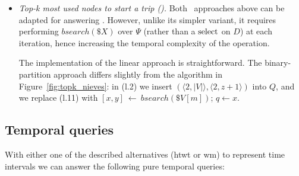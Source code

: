 \begin{itemize}[leftmargin=3mm]
	\item {\em Top-k most used nodes to start a trip (\Stks).}
	Both \Stk\ approaches above can be adapted for answering \Stks.
	However, unlike its simpler variant, it requires performing $bsearch(\$X)$ over $\Psi$ (rather than a $\operatorname{select}$ on $D$) at
	each iteration, hence increasing the temporal complexity of the operation.

	The implementation of the linear approach is straightforward. The binary-partition approach differs slightly 
	from the algorithm in Figure~\ref{fig:topk_nieves}: in (l.2) we insert $(\langle 2, |V| \rangle, \langle 2,z+1 \rangle)$ into $Q$, and we 
	replace (l.11) with $[x,y]~\leftarrow~bsearch(\$V[m])$; $q \leftarrow x$.


	\end{itemize}

	\subsection{Temporal queries}
	\label{sec:tq}
	With either one of the described alternatives (\gls{htwt} or \gls{wm}) to represent time intervals
	we can answer the following pure temporal queries:

